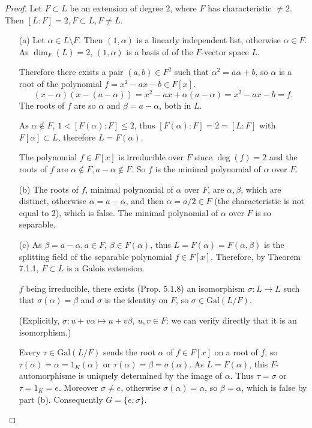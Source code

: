 \documentclass[11pt,a4paper]{article}
\newcommand{\Gal}{\mathrm{Gal}}
\begin{document}
\begin{proof}
 Let $F \subset L$ be an extension of degree 2, where $F$ has characteristic $\ne 2$. Then $[L:F] = 2, F\subset L, F\neq L$.
\begin{enumerate}
\item[(a)]
Let $\alpha \in L\setminus F$. Then $(1,\alpha)$ is a linearly independent list, otherwise $\alpha \in F$. As $\dim_F(L) = 2$, $(1,\alpha)$ is a basis of of the $F$-vector space $L$.

Therefore there exists a pair $(a,b) \in F^2$ such that $\alpha^2 = a\alpha+b$, so $\alpha$ is a root of the polynomial $f = x^2 -a x - b \in F[x]$.
$$(x-\alpha)(x-(a-\alpha))= x^2 - ax +\alpha(a-\alpha) = x^2-ax-b  = f.$$
 The roots of $f$ are so $\alpha$ and $\beta=a-\alpha$, both in $L$.

 As $\alpha \not \in F$, $1<[F(\alpha):F] \leq 2$, thus $[F(\alpha):F] = 2 = [L:F]$ with $F[\alpha] \subset L$, therefore $L=F(\alpha)$.

The polynomial $f \in F[x]$ is irreducible over $F$ since $\deg(f)= 2$ and the roots of $f$ are $\alpha\not \in F, a-\alpha \not \in F$. So $f$ is the minimal polynomial of $\alpha$ over $F$. 

\item[(b)]
The roots of $f$, minimal polynomial of $\alpha$ over $F$, are $\alpha, \beta$, which are distinct, otherwise $\alpha = a-\alpha$, and then $\alpha= a/2 \in F$ (the characteristic is not equal to 2), which is false. The minimal polynomial of $\alpha$ over $F$ is so separable.


\item[(c)]
As $\beta = a - \alpha, a \in F$, $\beta \in F(\alpha)$, thus $L = F(\alpha)= F(\alpha,\beta)$ is the splitting field of the separable polynomial $f \in F[x]$. Therefore, by Theorem 7.1.1, $F \subset L$ is a Galois extension.

$f$ being irreducible, there exists (Prop. 5.1.8) an isomorphism  $\sigma : L \to L$ such that $\sigma(\alpha) = \beta$ and $\sigma$ is the identity on $F$, so $\sigma \in \Gal(L/F)$.

(Explicitly, $\sigma : u+v\alpha \mapsto u+v \beta, \ u,v \in F$: we can verify directly that it is an isomorphism.)

Every $\tau \in \Gal(L/F)$ sends the root $\alpha$ of $f\in F[x]$ on a root of $f$, so $\tau(\alpha) = \alpha=1_K(\alpha)$ or $\tau(\alpha) = \beta = \sigma(\alpha)$. As $L = F(\alpha)$, this $F$-automorphisme is uniquely determined by the image of $\alpha$. Thus $\tau = \sigma$ or $\tau = 1_K = e$. Moreover $\sigma \ne e$, otherwise $\sigma(\alpha) = \alpha$, so $\beta = \alpha$, which is false by part (b). Consequently $G = \{e,\sigma\}$.


\end{enumerate}
\end{proof}
\end{document}
